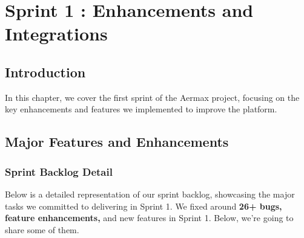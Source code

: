 \chapter{Sprint 1 : Enhancements and Integrations}

\section{Introduction}
In this chapter, we cover the first sprint of the Aermax project, focusing on the key enhancements and features we implemented to improve the platform.
\setcounter{secnumdepth}{0}
\section{Major Features and Enhancements}

\subsection{Sprint Backlog Detail}
Below is a detailed representation of our sprint backlog, showcasing the major tasks we committed to delivering in Sprint 1. We fixed around \textbf{26+ bugs, feature enhancements,} and new features in Sprint 1. Below, we're going to share some of them.


